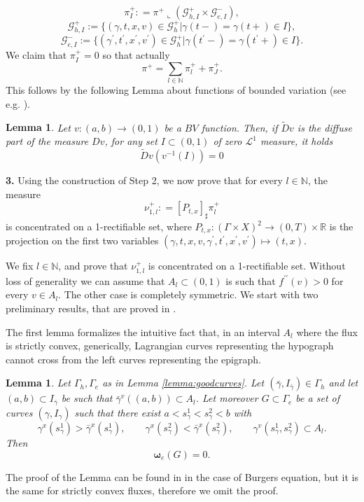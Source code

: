 \documentclass[11pt, twoside, reqno]{amsart}
\newtheorem{lemma}[thm]{Lemma}
\theoremstyle{definition}
\theoremstyle{remark}
\numberwithin{equation}{section}
\newcommand{\second}{{\prime \prime}}
\newcommand{\mc}[1]{\mathcal{#1}}
\newcommand{\bs}[1]{\boldsymbol{#1}}
\newcommand{\msc}[1]{\mathscr{#1}}
\newcommand{\wt}[1]{\widetilde{#1}}
\begin{document}
$$
\pi^+_I : = \pi^+\llcorner (\mc G^+_{h,I} \times \mc G^-_{e,I}),
$$
$$
\mc G^+_{h,I} := \Big\{ (\gamma, t, x, v) \in \mc G^+_h \Big| \gamma(t-) = \gamma(t+) \in I\Big\},
$$
$$
\mc G^-_{e,I} := \Big\{ (\gamma^{\prime}, t^{\prime}, x^{\prime}, v^{\prime}) \in \mc G^+_h \Big| \gamma(t^{\prime}-) = \gamma(t^{\prime}+) \in I\Big\}.
$$
We claim that $\pi^+_I = 0$ so that actually 
$$
\pi^+ = \sum_{l \in\mathbb N} \pi^+_l + \pi^+_{J}.
$$
This follows by the following Lemma about functions of bounded variation (see e.g. \cite{AFP_book}).
\begin{lemma}
    Let $v:(a, b) \to (0, 1)$ be a $BV$ function. Then, if $\wt D v$ is the diffuse part of the measure $Dv$, for any set $I \subset (0, 1)$ of zero $\msc L^1$ measure, it holds
    $$
    \wt D v(v^{-1}(I)) = 0
    $$
\end{lemma}

\vspace{0.5cm}
\textbf{3.}
Using the construction of Step 2, we now prove that for every $l \in \mathbb N$, the measure
\begin{equation}
    \nu^+_{1,l}: = [P_{t,x}]_{\sharp} \pi^+_l
\end{equation}
is concentrated on a 1-rectifiable set, where $P_{t,x} : (\Gamma \times X) ^2 \to (0, T) \times \mathbb R$ is the projection on the first two variables $(\gamma, t, x, v, \gamma^{\prime}, t^{\prime}, x^{\prime}, v^{\prime} ) \mapsto (t, x)$.

We fix $l \in \mathbb N$, and prove that $\nu^+_{1,l}$ is concentrated on a 1-rectifiable set. Without loss of generality we can assume that $A_l \subset (0, 1)$ is such that $f^{\second}(v) > 0$ for every $v \in A_l$. The other case is completely symmetric.
We start with two preliminary results, that are proved in \cite{marconi_burgers}. 

The first lemma formalizes the intuitive fact that, in an interval $A_l$ where the flux is strictly convex, generically, Lagrangian curves representing the hypograph cannot cross from the left curves representing the epigraph.
\begin{lemma}\label{lemma:nocrossing}
    Let $\Gamma_h, \Gamma_e$ as in Lemma \ref{lemma:goodcurves}. Let $(\bar \gamma, I_{\bar \gamma}) \in \Gamma_h$ and let $(a, b) \subset I_{\bar \gamma}$ 
 be such that $\bar \gamma^v((a, b) )\subset A_l$. Let moreover $G \subset \Gamma_e$ be a set of curves $(\gamma, I_{\gamma})$ such that there exist $a < s^1_{\gamma} < s^2_{\gamma}< b$ with
\begin{equation}\label{eq:crossingcond}
    \gamma^x(s^1_{\gamma}) > \bar \gamma^x (s^1_{\gamma}), \qquad \gamma^x(s^2_{\gamma}) <  \bar \gamma^x (s^2_{\gamma}), \qquad \gamma^v(s^1_{\gamma}, s^2_{\gamma}) \subset A_l.
\end{equation}
Then 
\begin{equation}
    \bs \omega_e(G) = 0.
\end{equation}
\end{lemma}
The proof of the Lemma can be found in \cite[Proposition 6]{marconi_burgers} in the case of Burgers equation, but it  is the same for strictly convex fluxes, therefore we omit the proof. 
\end{document}
